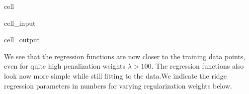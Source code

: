 \documentclass[letterpaper,10pt,english]{jupyterBook}
\begin{document}
\begin{sphinxuseclass}{cell}
\begin{sphinxVerbatimInput}
\begin{sphinxuseclass}{cell_input}
\end{sphinxuseclass}\end{sphinxVerbatimInput}
\begin{sphinxVerbatimOutput}

\begin{sphinxuseclass}{cell_output}
\noindent{}

\end{sphinxuseclass}\end{sphinxVerbatimOutput}

\end{sphinxuseclass}
\sphinxAtStartPar
We see that the regression functions are now closer to the training data points, even for quite high penalization weights \(\lambda>100\). The regression functions also look now more simple while still fitting to the data.We indicate the ridge regression parameters in numbers for varying regularization weights below.
\end{document}
